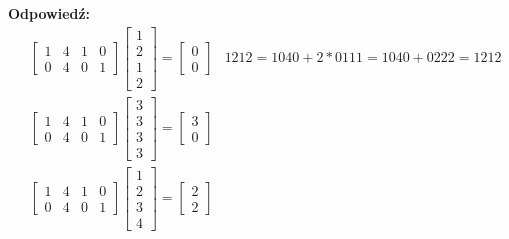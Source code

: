\begin{enumerate}[label=\alph*)]
\textbf{Odpowiedź: }\begin{align*}
&\begin{bmatrix}
1&4&1&0\\0&4&0&1
\end{bmatrix}\begin{bmatrix}
1\\2\\1\\2
\end{bmatrix}=\begin{bmatrix}
0\\0
\end{bmatrix}&1212=1040+2*0111=1040+0222=1212\\
&\begin{bmatrix}
1&4&1&0\\0&4&0&1
\end{bmatrix}\begin{bmatrix}
3\\3\\3\\3
\end{bmatrix}=\begin{bmatrix}
3\\0
\end{bmatrix}\\
&\begin{bmatrix}
1&4&1&0\\0&4&0&1
\end{bmatrix}\begin{bmatrix}
1\\2\\3\\4
\end{bmatrix}=\begin{bmatrix}
2\\2
\end{bmatrix}
\end{align*}
\end{enumerate}

